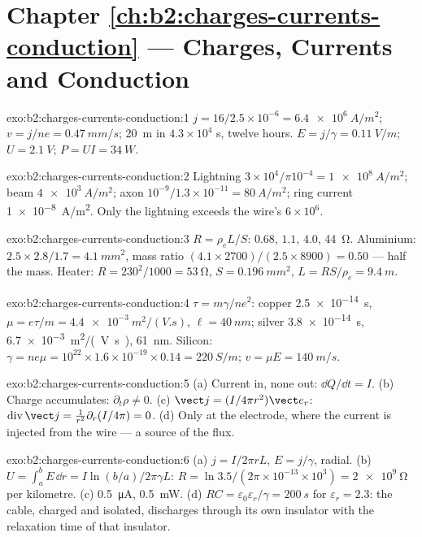 \section*{Chapter \ref{ch:b2:charges-currents-conduction} --- Charges, Currents and Conduction}

\begin{solution}{exo:b2:charges-currents-conduction:1}
$j = 16/2.5 \times 10^{-6} = \qty{6.4e6}{A/m^2}$; $v = j/ne = \qty{0.47}{mm/s}$; \qty{20}{m}
in $4.3 \times 10^4$ s, twelve hours. $E = j/\gamma = \qty{0.11}{V/m}$; $U = \qty{2.1}{V}$;
$P = UI = \qty{34}{W}$.
\end{solution}

\begin{solution}{exo:b2:charges-currents-conduction:2}
Lightning $3 \times 10^4/\pi10^{-4} = \qty{1e8}{A/m^2}$; beam $\qty{4e3}{A/m^2}$; axon
$10^{-9}/1.3 \times 10^{-11} = \qty{80}{A/m^2}$; ring current \qty{1e-8}{A/m^2}. Only the
lightning exceeds the wire's $6 \times 10^6$.
\end{solution}

\begin{solution}{exo:b2:charges-currents-conduction:3}
$R = \rho_eL/S$: $0.68$, $1.1$, $4.0$, \qty{44}{\ohm}. Aluminium: $2.5 \times 2.8/1.7 =
\qty{4.1}{mm^2}$, mass ratio $(4.1 \times 2700)/(2.5 \times 8900) = 0.50$ --- half the mass.
Heater: $R = 230^2/1000 = \qty{53}{\ohm}$, $S = \qty{0.196}{mm^2}$, $L = RS/\rho_e = \qty{9.4}{m}$.
\end{solution}

\begin{solution}{exo:b2:charges-currents-conduction:4}
$\tau = m\gamma/ne^2$: copper \qty{2.5e-14}{s}, $\mu = e\tau/m = \qty{4.4e-3}{m^2/(V.s)}$,
$\ell = \qty{40}{nm}$; silver \qty{3.8e-14}{s}, \qty{6.7e-3}{m^2/(V.s)}, \qty{61}{nm}.
Silicon: $\gamma = ne\mu = 10^{22} \times 1.6 \times 10^{-19} \times 0.14 = \qty{220}{S/m}$; $v =
\mu E = \qty{140}{m/s}$.
\end{solution}

\begin{solution}{exo:b2:charges-currents-conduction:5}
(a) Current in, none out: $\dd Q/\dd t = I$. (b) Charge accumulates: $\partial_t
\rho \ne 0$. (c) $\vect j = (I/4\pi r^2)\vect e_r$: $\operatorname{div}\vect j = \frac1{r^2}
\partial_r(I/4\pi) = 0$. (d) Only at the electrode, where the current is
injected from the wire --- a source of the flux.
\end{solution}

\begin{solution}{exo:b2:charges-currents-conduction:6}
(a) $j = I/2\pi rL$, $E = j/\gamma$, radial. (b) $U = \int_a^bE\,\dd r = I\ln(b/a)/
2\pi\gamma L$: $R = \ln3.5/(2\pi \times 10^{-13} \times 10^3) = \qty{2e9}{\ohm}$ per kilometre.
(c) \qty{0.5}{\micro A}, \qty{0.5}{mW}. (d) $RC = \varepsilon_0\varepsilon_r/\gamma = \qty{200}{s}$ for
$\varepsilon_r = 2.3$: the cable, charged and isolated, discharges through its own
insulator with the relaxation time of that insulator.
\end{solution}

